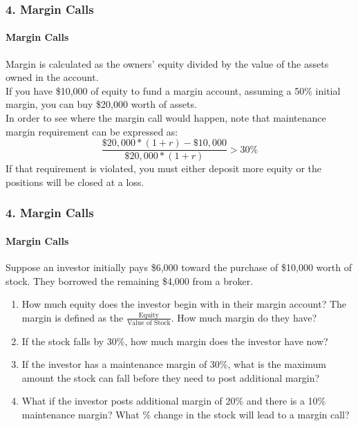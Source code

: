\documentclass{beamer}
\begin{document}
\begin{frame}[t]
    \frametitle{4. Margin Calls}
    \framesubtitle{Margin Calls}

    Margin is calculated as the owners' equity divided by the value of the assets owned in the account.\\
    \vspace{1em}
    If you have \$10,000 of equity to fund a margin account, assuming a 50\% initial margin, you can buy \$20,000 worth of assets.\\
    \vspace{1em}
    In order to see where the margin call would happen, note that maintenance margin requirement can be expressed as:
    $$\frac{\$20,000 * (1+r) - \$10,000}{\$20,000 * (1+r)} > 30\%$$
    If that requirement is violated, you must either deposit more equity or the positions will be closed at a loss.

\end{frame}

\begin{practiceframe}
    \frametitle{4. Margin Calls}
    \framesubtitle{Margin Calls}

    Suppose an investor initially pays \$6,000 toward the purchase of \$10,000 worth of stock.   They borrowed the remaining \$4,000 from a broker.  
    \begin{enumerate}
        \item How much equity does the investor begin with in their margin account?   The margin is defined as the $\frac{\text{Equity}}{\text{Value of Stock}}$.   How much margin do they have?\\
        \item If the stock falls by 30\%, how much margin does the investor have now?\\
        \item If the investor has a maintenance margin of 30\%, what is the maximum amount the stock can fall before they need to post additional margin?  
        \item What if the investor posts additional margin of 20\% and there is a 10\% maintenance margin?   What \% change in the stock will lead to a margin call?
    \end{enumerate}
\end{practiceframe}
\end{document}
